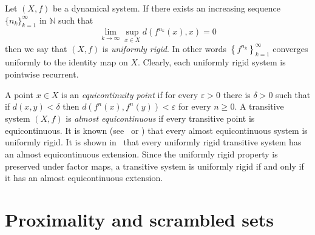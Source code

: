 \documentclass[reqno,a4paper,12pt]{amsart}
\theoremstyle{definition}
\numberwithin{equation}{section}
\begin{document}
Let $(X,f)$ be a dynamical system.
If there exists an increasing sequence $\{n_k\}_{k=1}^\infty$ in ${\mathbb{N}}$ such that
$$
\lim_{k\to \infty}\sup_{x\in X}d(f^{n_k}(x),x)=0
$$
then we say that $(X,f)$ is \emph{uniformly rigid}.
In other words ${\left\{{f^{n_k}}\right\}}_{k=1}^\infty$ converges uniformly to the identity map on $X$.
Clearly, each uniformly rigid system is pointwise recurrent.

A point $x\in X$ is an \emph{equicontinuity point} if for every ${\varepsilon}>0$ there is $\delta>0$
such that if $d(x,y)<\delta$ then $d(f^n(x),f^n(y))<{\varepsilon}$ for every $n\geq 0$.
A transitive system $(X,f)$ is \emph{almost equicontinuous}
if every transitive point is equicontinuous.
It is known (see~\cite[Lemma~1.2]{GW93} or \cite[Corollary~3.7]{AAB})
that every almost equicontinuous system is uniformly rigid.
It is shown in~\cite[Propsition~1.5]{GW93} that every uniformly rigid transitive system
has an almost equicontinuous extension.
Since the uniformly rigid property is preserved under factor maps,
a transitive system is uniformly rigid if and only if it has an almost equicontinuous extension.

\section{Proximality and scrambled sets}
\end{document}
